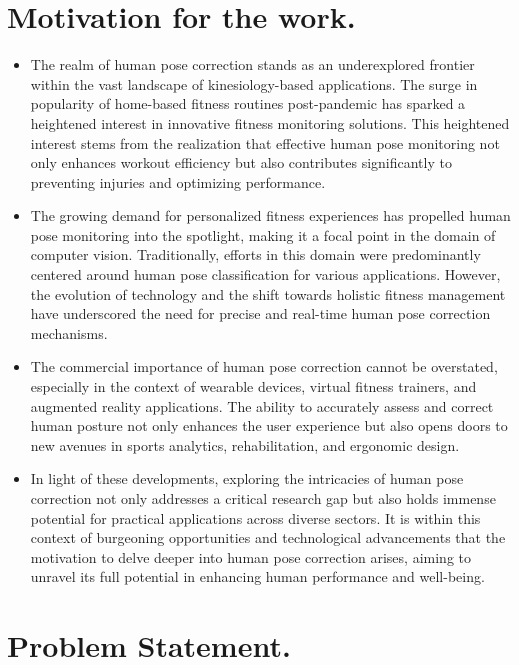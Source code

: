 \section{ Motivation for the work.} 
\setlength{\parindent}{20pt}
\begin{itemize}
\item The realm of human pose correction stands as an underexplored frontier within the vast landscape of kinesiology-based applications. The surge in popularity of home-based fitness routines post-pandemic has sparked a heightened interest in innovative fitness monitoring solutions. This heightened interest stems from the realization that effective human pose monitoring not only enhances workout efficiency but also contributes significantly to preventing injuries and optimizing performance.

\item The growing demand for personalized fitness experiences has propelled human pose monitoring into the spotlight, making it a focal point in the domain of computer vision. Traditionally, efforts in this domain were predominantly centered around human pose classification for various applications. However, the evolution of technology and the shift towards holistic fitness management have underscored the need for precise and real-time human pose correction mechanisms.

\item The commercial importance of human pose correction cannot be overstated, especially in the context of wearable devices, virtual fitness trainers, and augmented reality applications. The ability to accurately assess and correct human posture not only enhances the user experience but also opens doors to new avenues in sports analytics, rehabilitation, and ergonomic design.

\item In light of these developments, exploring the intricacies of human pose correction not only addresses a critical research gap but also holds immense potential for practical applications across diverse sectors. It is within this context of burgeoning opportunities and technological advancements that the motivation to delve deeper into human pose correction arises, aiming to unravel its full potential in enhancing human performance and well-being.
\end{itemize}

\section{Problem Statement.}

